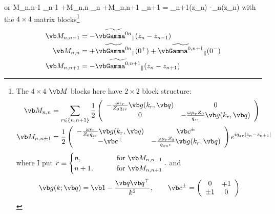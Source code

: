 \documentclass[letterpaper]{article}
\renewcommand{\wt}{\widetilde}
\begin{document}
or
{
  \vb M_{n,n-1}  \cdot \wt{\bmc S}_{n-1}
 +\vb M_{n,n}    \cdot \wt{\bmc S}_{n}
 +\vb M_{n,n+1}  \cdot \wt{\bmc S}_{n+1}
 =  \wt{\bmc F}_{n+1\parallel}(z_n)
   -\wt{\bmc F}_{n\parallel}(z_n)
}
with the $4\times 4$ matrix blocks\footnote{The $4\times 4$ $\vb M$
blocks here have $2\times 2$ block structure:
\begin{align}
 \vb M_{n, n}
   &= \sum_{r\in \{n, n+1\}}
     \frac{1}{2}
     \left(\begin{array}{cc}
     -\frac{\omega\epsilon_r}{Z_0 q_{zr}}\vb g(k_r, \vb q)
   & 0
 \\
     0
   & -\frac{\omega\mu_r Z_0 }{q_{zr}}\vb g(k_r, \vb q)
   \end{array}\right)
\\
 \vb M_{n, n \pm 1}
   &= \frac{1}{2}
     \left(\begin{array}{cc}
     -\frac{\omega\epsilon_r}{Z_0 q_{zr}}\vb g(k_r, \vb q)
   & \vb c^\pm
 \\
     -\vb  c^\pm
   & -\frac{\omega\mu_r Z_0 }{q_{zn^*}}\vb g(k_r, \vb q)
     \end{array}\right)e^{iq_{zr}|z_n-z_{n\pm 1}|}
\end{align}
where I put
$  r \equiv  \begin{cases} n,   \qquad &\text{ for } \vb M_{n,n-1} \\
                           n+1, \qquad &\text{ for } \vb M_{n,n+1}
              \end{cases}.
$
and 
$$ \vb g(k; \vb q) =
   \vb 1 - \frac{\vb q\vb q^\top}{k^2},
   \qquad 
   \vb c^\pm
   =\left(\begin{array}{cc} 0 & \mp 1 \\ \pm 1 & 0 \end{array}\right)
$$}
\begin{subequations}
\begin{align}
  \vb M_{n,n-1} &= -\wt{\vbGamma^{0n}}_{\parallel}(z_n-z_{n-1}) 
\\
  \vb M_{n,n} &= +\wt{\vbGamma^{0n}}_{\parallel}(0^+)
                 +\wt{\vbGamma^{0,n+1}}_{\parallel}(0^-)
\\
  \vb M_{n,n+1} &= -\wt{\vbGamma^{0,n+1}}_{\parallel}(z_n-z_{n+1}) 
\end{align}
\label{MChunks}%
\end{subequations}
\end{document}
